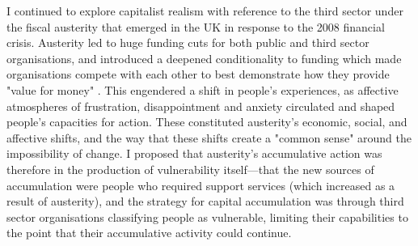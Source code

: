 I continued to explore capitalist realism with reference to the third sector under the fiscal austerity that emerged in the UK in response to the 2008 financial crisis. Austerity led to huge funding cuts for both public and third sector organisations, and introduced a deepened conditionality to funding  which made organisations compete with each other to best demonstrate how they provide "value for money" \citep{clifford_charitable_2017, jones_uneven_2016, clayton_distancing_2016}. This engendered a shift in people's experiences, as affective atmospheres of frustration, disappointment and anxiety circulated \citep{hitchen_living_2016} and shaped people's capacities for action. These constituted austerity's economic, social, and affective shifts, and the way that these shifts create a "common sense" around the impossibility of change. I proposed that austerity's accumulative action was therefore in the production of vulnerability itself—that the new sources of accumulation were people who required support services  (which increased as a result of austerity), and the strategy for capital accumulation was through third sector organisations classifying people as vulnerable, limiting their capabilities to the point that their accumulative activity could continue. 

